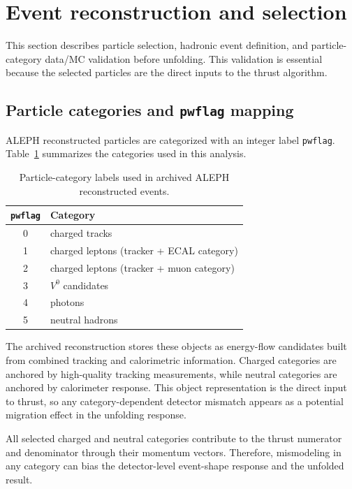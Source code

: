 \section{Event reconstruction and selection}
\label{sec:event_selection}

This section describes particle selection, hadronic event definition, and particle-category data/MC validation before unfolding. This validation is essential because the selected particles are the direct inputs to the thrust algorithm.

\subsection{Particle categories and \texttt{pwflag} mapping}

ALEPH reconstructed particles are categorized with an integer label \texttt{pwflag}. Table~\ref{tab:pwflag_definition} summarizes the categories used in this analysis.

\begin{table}[t!]
\centering
\begin{tabular}{c l}
\hline
\texttt{pwflag} & Category \\
\hline
0 & charged tracks \\
1 & charged leptons (tracker + ECAL category) \\
2 & charged leptons (tracker + muon category) \\
3 & $V^{0}$ candidates \\
4 & photons \\
5 & neutral hadrons \\
\hline
\end{tabular}
\caption{Particle-category labels used in archived ALEPH reconstructed events.}
\label{tab:pwflag_definition}
\end{table}

The archived reconstruction stores these objects as energy-flow candidates built from combined
tracking and calorimetric information. Charged categories are anchored by high-quality tracking
measurements, while neutral categories are anchored by calorimeter response. This object
representation is the direct input to thrust, so any category-dependent detector mismatch appears
as a potential migration effect in the unfolding response.

All selected charged and neutral categories contribute to the thrust numerator and denominator through their momentum vectors. Therefore, mismodeling in any category can bias the detector-level event-shape response and the unfolded result.

